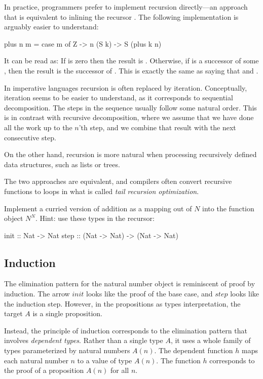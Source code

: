 \documentclass[DaoFP]{subfiles}
\begin{document}
In practice, programmers prefer to implement recursion directly---an approach that is equivalent to inlining the recursor . The following implementation is arguably easier to understand:
\begin{haskell}
plus n m = case m of
  Z -> n
  (S k) -> S (plus k n)
\end{haskell}
It can be read as: If  is zero then the result is . Otherwise, if  is a successor of some , then the result is the successor of  . This is exactly the same as saying that  and .

In imperative languages recursion is often replaced by iteration. Conceptually, iteration seems to be easier to understand, as it corresponds to sequential decomposition. The steps in the sequence usually follow some natural order. This is in contrast with recursive decomposition, where we assume that we have done all the work up to the $n$'th step, and we combine that result with the next consecutive step. 

On the other hand, recursion is more natural when processing recursively defined data structures, such as lists or trees. 

The two approaches are equivalent, and compilers often convert recursive functions to loops in what is called \emph{tail recursion optimization}.

\begin{exercise}
Implement a curried version of addition as a mapping out of $N$ into the function object $N^N$. Hint: use these types in the recursor:
\begin{haskell}
init :: Nat -> Nat
step :: (Nat -> Nat) -> (Nat -> Nat)
\end{haskell}

\end{exercise}


\subsection{Induction}

The elimination pattern for the natural number object is reminiscent of proof by induction. The arrow $init$ looks like the proof of the base case, and $step$ looks like the induction step. However, in the propositions as types interpretation, the target $A$ is a single proposition. 

Instead, the principle of induction corresponds to the elimination pattern that involves \emph{dependent types}. Rather than a single type $A$, it uses a whole family of types parameterized by natural numbers $A(n)$. The dependent function $h$ maps each natural number $n$ to a value of type $A(n)$. The function $h$ corresponds to the proof of a proposition $A(n)$ for all $n$. 
\end{document}
